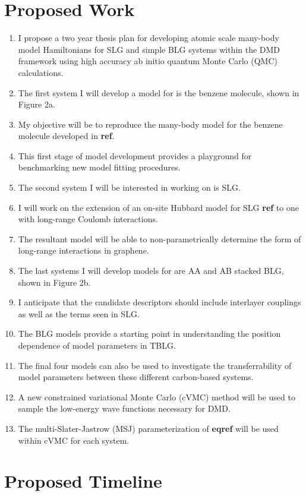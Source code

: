 \documentclass{article}
\begin{document}
\section{Proposed Work}
\begin{enumerate}
\item I propose a two year thesis plan for developing atomic scale many-body
model Hamiltonians for SLG and simple BLG systems within the DMD framework using high accuracy ab initio quantum Monte Carlo (QMC)
calculations.

\item The first system I will develop a model for is the benzene molecule, shown in Figure 2a.

\item My objective will be to reproduce the many-body model for the benzene molecule developed in \textbf{ref}.

\item This first stage of model development provides a playground for benchmarking new model fitting procedures.

\item The second system I will be interested in working on is SLG.

\item I will work on the extension of an on-site Hubbard model for SLG \textbf{ref} to one with long-range Coulomb interactions.

\item The resultant model will be able to non-parametrically determine the form of long-range interactions in graphene.

\item The last systems I will develop models for are AA and AB stacked BLG, shown in Figure 2b.

\item I anticipate that the candidate descriptors should include interlayer couplings as well as the terms seen in SLG.

\item The BLG models provide a starting point in understanding the position dependence of model parameters in TBLG.

\item The final four models can also be used to investigate the transferrability
of model parameters between these different carbon-based systems.

\item A new constrained variational Monte Carlo (cVMC) method will be used to sample the low-energy wave functions necessary for DMD. 

\item The multi-Slater-Jastrow (MSJ) parameterization of \textbf{eqref} will be used within cVMC for each system.
\end{enumerate}


\section{Proposed Timeline}
\end{document}
